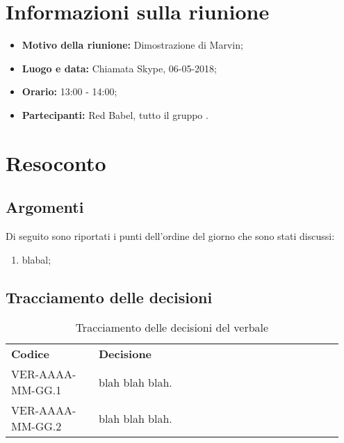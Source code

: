 \documentclass[VER-2018-05-06.tex]{subfiles}
\begin{document}
\chapter{Informazioni sulla riunione}
\begin{itemize}
	\item \textbf{Motivo della riunione:} Dimostrazione di Marvin;
	\item \textbf{Luogo e data:} Chiamata Skype, 06-05-2018;
	\item \textbf{Orario:} 13:00 - 14:00;
	\item \textbf{Partecipanti:} Red Babel, tutto il gruppo \gruppo.
\end{itemize}



\chapter{Resoconto}
\section{Argomenti}
Di seguito sono riportati i punti dell'ordine del giorno che sono stati discussi:
\begin{enumerate}
	\item blabal;
\end{enumerate}
\section{Tracciamento delle decisioni}
\begin{table}[H]
	\begin{center}
		\begin{tabu} to 
			\tableHeaderStyle
			\textbf{Codice} & \textbf{Decisione} \\
			VER-AAAA-MM-GG.1 & blah blah blah. \\
			VER-AAAA-MM-GG.2 & blah blah blah. \\
		\end{tabu}
		\caption{Tracciamento delle decisioni del verbale}
	\end{center}
\end{table}
\end{document}

